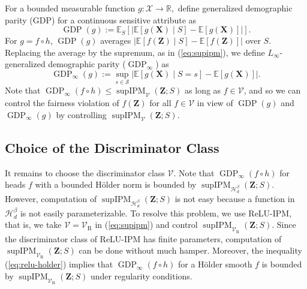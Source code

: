 \documentclass{article} %
\begin{document}
For a bounded measurable function $g:\mathcal{X}\rightarrow \mathbb{R},$ \citet{jiang2022generalized} define generalized demographic parity (GDP) for a continuous sensitive attribute as
\begin{equation}
  \operatorname{GDP}(g)
  :=\mathbb{E}_{S}\!\left[
    \left|
      \mathbb{E}[g(\mathbf{X})\mid S]
      -\mathbb{E}[g(\mathbf{X})]
    \right|
  \right].
  \label{eq:gdp}
\end{equation}
For $g=f\circ h$, $\operatorname{GDP}(g)$ averages $\left|\mathbb{E}[f(\mathbf{Z})\mid S]-\mathbb{E}[f(\mathbf{Z})]\right|$ over $S$.  Replacing the average by the supremum, as in (\ref{eq:supipm}), we define $L_{\infty}$-generalized demographic parity ($\operatorname{GDP}_{\infty}$) as
\begin{equation}
  \operatorname{GDP}_{\infty}(g)
  :=\sup_{s\in\mathcal{S}}
  \left|
    \mathbb{E}[g(\mathbf{X})\mid S=s]
    -\mathbb{E}[g(\mathbf{X})]
  \right|.
  \label{eq:linfty-gdp}
\end{equation}
Note that $\operatorname{GDP}_{\infty}(f\circ h)\le\operatorname{supIPM}_{\mathcal{V}}(\mathbf{Z};S)$ as long as  $f\in\mathcal{V}$, 
and so we can control the fairness violation of $f(\mathbf{Z})$ for all $f\in \mathcal{V}$ 
in view of $\operatorname{GDP}(g)$ and $\operatorname{GDP}_{\infty}(g)$
by controlling $\operatorname{supIPM}_{\mathcal{V}}(\mathbf{Z};S)$.


\subsection{Choice of the Discriminator Class}
\label{sec:discriminator-choice}

It remains to choose the discriminator class $\mathcal{V}$.  
Note that $\operatorname{GDP}_{\infty}(f\circ h)$ for heads $f$ with a bounded H\"older norm is bounded by
$\operatorname{supIPM}_{\mathcal{H}^{\beta}_d}(\mathbf{Z};S).$
However, computation of $\operatorname{supIPM}_{\mathcal{H}^{\beta}_d}(\mathbf{Z};S)$
is not easy because a function in $\mathcal{H}^{\beta}_d$ is not easily parameterizable.
To resolve this problem, we use ReLU-IPM, that is, we take $\mathcal{V}=\mathcal{V}_{\mathrm{R}}$ in (\ref{eq:supipm}) and control $\operatorname{supIPM}_{\mathcal{V}_{\mathrm{R}}}(\mathbf{Z};S)$. Since the discriminator class of ReLU-IPM has finite parameters,
computation of $\operatorname{supIPM}_{\mathcal{V}_{\mathrm{R}}}(\mathbf{Z};S)$ can be done without much hamper.
Moreover, the inequality (\ref{eq:relu-holder}) implies
that $\operatorname{GDP}_{\infty}(f\circ h)$ for a H\"{o}lder smooth $f$ is bounded by $\operatorname{supIPM}_{\mathcal{V}_{\mathrm{R}}}(\mathbf{Z};S)$
under regularity conditions.
\end{document}
